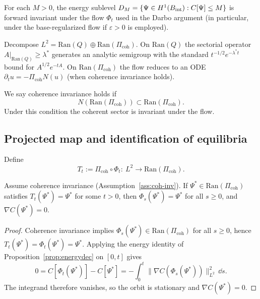 \documentclass[11pt]{article}
\providecommand{\Bint}{B_{\mathrm{int}}}
\providecommand{\PiCoh}{\Pi_{\mathrm{coh}}}
\providecommand{\Qop}{Q}
\providecommand{\Aop}{A}
\providecommand{\Ran}{\mathrm{Ran}}
\providecommand{\lamstar}{\ensuremath{\lambda^{\ast}}}
\begin{document}
\begin{assumption}\label{ass:sublevel-inv}
For each $M>0$, the energy sublevel $\DM=\{\Psi\in H^1(\Bint): C[\Psi]\le M\}$ is forward invariant under the
flow $\Phi_t$ used in the Darbo argument (in particular, under the base-regularized flow if $\varepsilon>0$ is employed).
\end{assumption}


\begin{remark}
Decompose $L^2=\Ran(\Qop)\oplus \Ran(\PiCoh)$.
On $\Ran(\Qop)$ the sectorial operator $\Aop|_{\Ran(\Qop)}\ge \lamstar$ generates an analytic semigroup with the standard
$t^{-1/2}e^{-\lamstar t}$ bound for $\Aop^{1/2}e^{-t\Aop}$.
On $\Ran(\PiCoh)$ the flow reduces to an ODE $\partial_t u=-\PiCoh N(u)$ (when coherence invariance holds).
\end{remark}

\begin{assumption}\label{ass:coh-inv}
We say coherence invariance holds if
\[
N(\Ran(\PiCoh))\subset \Ran(\PiCoh).
\]
Under this condition the coherent sector is invariant under the flow.
\end{assumption}

\subsection{Projected map and identification of equilibria}

Define
\[
T_t := \PiCoh\circ \Phi_t:\ L^2\to \Ran(\PiCoh).
\]

\begin{proposition}\label{prop:projfix}
Assume coherence invariance (Assumption~\ref{ass:coh-inv}).
If $\Psi^\ast\in \Ran(\PiCoh)$ satisfies $T_t(\Psi^\ast)=\Psi^\ast$ for some $t>0$, then
$\Phi_s(\Psi^\ast)=\Psi^\ast$ for all $s\ge 0$, and $\nabla C(\Psi^\ast)=0$.
\end{proposition}

\begin{proof}
Coherence invariance implies $\Phi_s(\Psi^\ast)\in\Ran(\PiCoh)$ for all
$s\ge0$, hence $T_t(\Psi^\ast)=\Phi_t(\Psi^\ast)=\Psi^\ast$. Applying the
energy identity of Proposition~\ref{prop:energydec} on $[0,t]$ gives
\[
0=C[\Phi_t(\Psi^\ast)]-C[\Psi^\ast]
=-\int_0^t\|\nabla C(\Phi_s(\Psi^\ast))\|_{L^2}^2\,\dd s.
\]
The integrand therefore vanishes, so the orbit is stationary and
$\nabla C(\Psi^\ast)=0$.
\end{proof}
\end{document}
